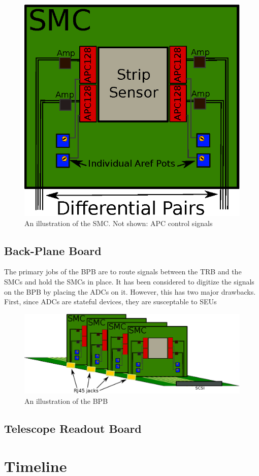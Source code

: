 \documentclass{article}
\begin{document}
\begin{figure}[h!]
  \centering
  \includegraphics{./figures/SMC.eps}
  \caption{An illustration of the SMC. Not shown: \gls{APC} control signals}
  \label{fig:SMC}
\end{figure}


\subsection{Back-Plane Board}

The primary jobs of the \gls{BPB} are to route signals between the \gls{TRB} and the \gls{SMC}s and hold the \gls{SMC}s in place. It has been considered to digitize the signals on the \gls{BPB} by placing the ADCs on it. However, this has two major drawbacks. First, since ADCs are stateful devices, they are susceptable to \gls{SEU}s

\begin{figure}[h!]
  \centering
  \includegraphics{./figures/BPB.eps}
  \caption{An illustration of the BPB}
  \label{fig:PBP}
\end{figure}

\subsection{Telescope Readout Board}

\section{Timeline}

\newpage



\glsaddall
\printglossaries
\end{document}
